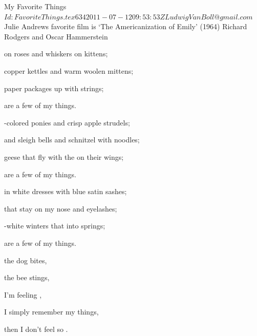 \begin{SBSong}{My Favorite Things}
  {$Id: FavoriteThings.tex 634 2011-07-12 09:53:53Z LudwigVanBoll@gmail.com $}
  {Julie Andrews favorite film is `The Americanization of Emily' (1964)}
  {Richard Rodgers and Oscar Hammerstein}
  \begin{SBVerse} 
	 on roses and whiskers on kittens;
	
	 copper kettles and warm woolen mittens;
	
	 paper packages  up with strings;
	
	 are a few of my  things.
  \end{SBVerse}
  \begin{SBVerse}
	-colored ponies and crisp apple strudels;
	
	 and sleigh bells and schnitzel with noodles;
	
	 geese that fly with the  on their wings;
	
	 are a few of my  things.
  \end{SBVerse}
  \begin{SBVerse}
	 in white dresses with blue satin sashes;
	
	 that stay on my nose and eyelashes;
	
	-white winters that  into springs;
	
	 are a few of my  things.
  \end{SBVerse}
  \begin{SBVerse}
	 the dog bites,
	
	 the bee stings,
	
	 I'm feeling ,
	
	I simply remember my  things,
	
	 then I don't feel so .
  \end{SBVerse}
\end{SBSong}